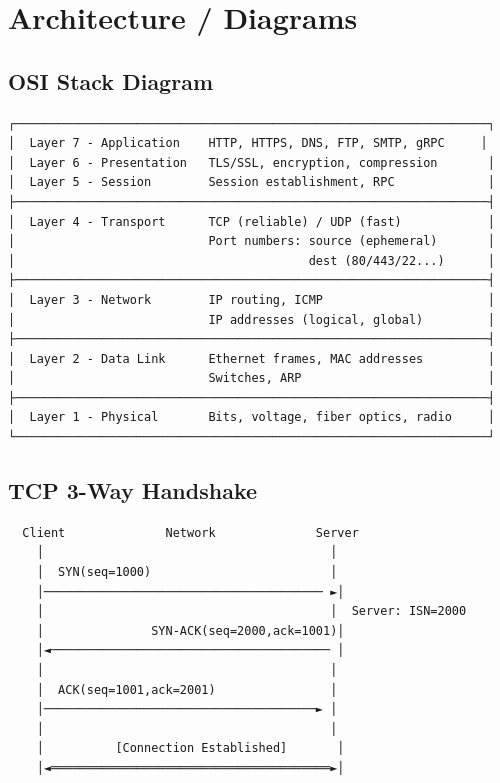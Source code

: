 \documentclass[11pt]{article}
\begin{document}
\section{Architecture / Diagrams}\label{architecture--diagrams}

\subsection{OSI Stack Diagram}\label{osi-stack-diagram}

\setcodelang{}

\begin{verbatim}
┌──────────────────────────────────────────────────────────────────┐
│  Layer 7 - Application    HTTP, HTTPS, DNS, FTP, SMTP, gRPC     │
│  Layer 6 - Presentation   TLS/SSL, encryption, compression       │
│  Layer 5 - Session        Session establishment, RPC             │
├──────────────────────────────────────────────────────────────────┤
│  Layer 4 - Transport      TCP (reliable) / UDP (fast)            │
│                           Port numbers: source (ephemeral)       │
│                                         dest (80/443/22...)      │
├──────────────────────────────────────────────────────────────────┤
│  Layer 3 - Network        IP routing, ICMP                       │
│                           IP addresses (logical, global)         │
├──────────────────────────────────────────────────────────────────┤
│  Layer 2 - Data Link      Ethernet frames, MAC addresses         │
│                           Switches, ARP                          │
├──────────────────────────────────────────────────────────────────┤
│  Layer 1 - Physical       Bits, voltage, fiber optics, radio     │
└──────────────────────────────────────────────────────────────────┘
\end{verbatim}

\subsection{TCP 3-Way Handshake}\label{tcp-3-way-handshake}


\setcodelang{}

\begin{verbatim}
  Client              Network              Server
    │                                        │
    │  SYN(seq=1000)                         │
    │─────────────────────────────────────── ►│
    │                                        │  Server: ISN=2000
    │               SYN-ACK(seq=2000,ack=1001)│
    │◄─────────────────────────────────────── │
    │                                        │
    │  ACK(seq=1001,ack=2001)                │
    │──────────────────────────────────────► │
    │                                        │
    │          [Connection Established]       │
    │◄═══════════════════════════════════════►│
\end{verbatim}
\end{document}
